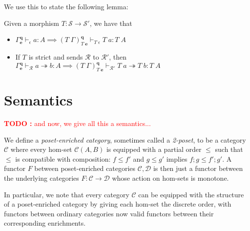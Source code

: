 \documentclass[acmsmall,screen,review]{acmart}
\newcounter{todos}
\newcommand{\TODO}[1]{{
  \stepcounter{todos}
  \begin{center}\large{\textcolor{red}{\textbf{TODO \arabic{todos}:} #1}}\end{center}
}}
\newcommand{\mc}[1]{\ensuremath{\mathcal{#1}}}
\newcommand{\mb}[1]{\ensuremath{\mathbf{#1}}}
\newcommand{\hasty}[4]{#1 \vdash_{#2} #3: {#4}}
\newcommand{\tref}{\twoheadrightarrow}
\newcommand{\tmle}[5]{#1 \vdash_{#2} #3 \tref #4 : {#5}}
\begin{document}
We use this to state the following lemma:
\begin{lemma}
  Given a morphism $T: \mc{S} \to \mc{S}'$, we have that
  \begin{itemize}
    \item $\hasty{\Gamma^{\mb{q}}_{\mb{e}}}{\epsilon}{a}{A} 
      \implies \hasty{(T\;\Gamma)^{\mb{q}}_{T\;\mb{e}}}{T\;\epsilon}{T\;a}{T\;A}$
    \item If $T$ is strict and sends $\mc{R}$ to $\mc{R}'$, then
    $\tmle{\Gamma^{\mb{q}}_{\mb{e}}}{\mc{R}}{a}{b}{A}
      \implies \tmle{(T\;\Gamma)^{\mb{q}}_{T\;\mb{e}}}{\mc{R}'}{T\;a}{T\;b}{T\;A}$
  \end{itemize}
\end{lemma}

\section{Semantics}

\TODO{and now, we give all this a semantics...}

\begin{definition}
  We define a \emph{poset-enriched category}, sometimes called a \emph{2-poset}, to be a category
  $\mc{C}$ where every hom-set $\mc{C}(A, B)$ is equipped with a partial order $\leq$ such that
  $\leq$ is compatible with composition: $f \leq f'$ and $g \leq g'$ implies $f;g \leq f';g'$. A
  functor $F$ between poset-enriched categories $\mc{C}, \mc{D}$ is then just a functor between the
  underlying categories $F : \mc{C} \to \mc{D}$ whose action on hom-sets is monotone.

  In particular, we note that every category $\mc{C}$ can be equipped with the structure of a
  poset-enriched category by giving each hom-set the discrete order, with functors between ordinary
  categories now valid functors between their corresponding enrichments.
\end{definition}
\end{document}

